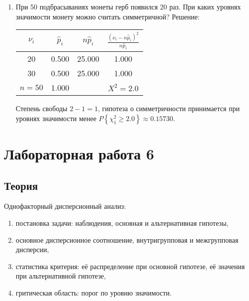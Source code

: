 \documentclass[a4paper,12pt]{article}
\newcommand{\probability}[1]{P \left\{ #1 \right\}}
\begin{document}
\begin{enumerate}
      \item \cite[281]{Efimov} При 50 подбрасываниях монеты герб появился 20 раз. При каких уровнях значимости монету можно считать симметричной?
            Решение: \par
                  \begin{tabular}{|c|c|c|c|}
                        \hline
                        $\nu_i$  & $\widehat{p}_i$ & $n \widehat{p}_i$ & $\frac{(\nu_i - n \widehat{p}_i)^2}{n \widehat{p}_i}$ \\
                        \hline
                        20       & 0.500           & 25.000            & 1.000                                                 \\
                        30       & 0.500           & 25.000            & 1.000                                                 \\
                        \hline
                        $n = 50$ & 1.000           &                   & $X^2 = 2.0$                                           \\
                        \hline
                  \end{tabular}

                  Степень свободы $2 - 1 = 1$, гипотеза о симметричности принимается при уровнях значимости менее
                  $\probability{\chi_1^2 \ge 2.0} \approx 0.15730$.

\end{enumerate}

\section*{Лабораторная работа 6}

\subsection*{Теория}

Однофакторный дисперсионный анализ:
\begin{enumerate}
      \item постановка задачи: наблюдения, основная и альтернативная гипотезы,
      \item основное дисперсионное соотношение, внутригрупповая и межгрупповая дисперсии,
      \item статистика критерия: её распределение при основной гипотезе, её значения при альтернативной гипотезе,
      \item гритическая область: порог по уровню значимости.
\end{enumerate}
\end{document}
